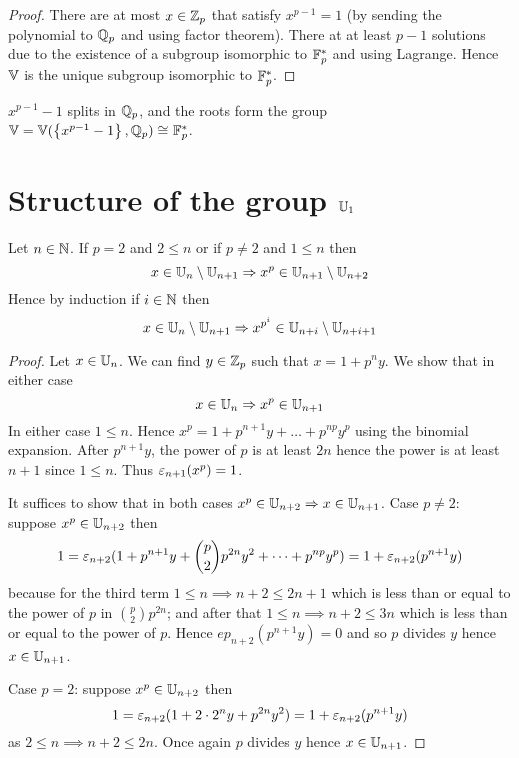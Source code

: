 \begin{proof}
    There are at most $x \in \mathbb{Z}_p$ that satisfy $x^{p-1} = 1$ 
    (by sending the polynomial to $\mathbb{Q}_p$ and using factor theorem).
    There at at least $p - 1$ solutions due to the existence of 
    a subgroup isomorphic to $\mathbb{F}_p^*$ and using Lagrange.
    Hence $\mathbb{V}$ is the unique subgroup isomorphic to $\mathbb{F}_p^*$.
\end{proof}

\begin{cor}
    $x^{p-1} - 1$ splits in $\mathbb{Q}_p$, 
    and the roots form the group 
    $\mathbb{V} = \mathbb{V}(\left\{x^{p-1} - 1\right\},\mathbb{Q}_p) \cong_{} \mathbb{F}_p^*$.
\end{cor}

\section{Structure of the group $\mathbb{U}_1$}

\begin{prop}
    Let $n \in \mathbb{N}$.
    If $p = 2$ and $2 \le n$ 
    or if $p \ne 2$ and $1 \le n$ then
    \[x \in \mathbb{U}_n \setminus \mathbb{U}_{n+1} 
    \Rightarrow x^p \in \mathbb{U}_{n+1} \setminus \mathbb{U}_{n+2} \]
    Hence by induction if $i \in \mathbb{N}$ then
    \[x \in \mathbb{U}_n \setminus \mathbb{U}_{n+1} 
    \Rightarrow x^{p^i} \in \mathbb{U}_{n + i} \setminus \mathbb{U}_{n + i + 1} \]
\end{prop}
\begin{proof}
    Let $x \in \mathbb{U}_n$. 
    We can find $y \in \mathbb{Z}_p$
    such that $x = 1 + p^n y$.
    We show that in either case 
    \[x \in \mathbb{U}_n \Rightarrow x^p \in \mathbb{U}_{n+1}\]
    In either case $1 \le n$.
    Hence $x^p = 1 + p^{n+1} y + \dots + p^{np} y^p$
    using the binomial expansion. 
    After $p^{n+1} y$, the power of $p$ is at least $2n$
    hence the power is at least $n+1$ since $1 \le n$.
    Thus $\varepsilon_{n+1} (x^p) = 1$.

    It suffices to show that in both cases
    $x^p \in \mathbb{U}_{n+2} \Rightarrow x \in \mathbb{U}_{n+1}$.
    Case $p \ne 2$: suppose $x^p \in \mathbb{U}_{n+2}$ then
    \[1 = 
    \varepsilon_{n+2} (
        1 + p^{n+1} y + \binom{p}{2} p^{2n} y^2 
        + \dots + p^{np}y^p
        )
     = 1 + \varepsilon_{n+2}(p^{n+1} y)\]
    because for the third term 
    $1 \le n \implies n + 2 \le 2n + 1$
    which is less than or equal to the power of 
    $p$ in $\binom{p}{2} p^{2n}$;
    and after that $1 \le n \implies n + 2 \le 3n$
    which is less than or equal to the power of $p$.
    Hence $ep_{n+2}(p^{n+1} y) = 0$ and so $p$ divides $y$
    hence $x \in \mathbb{U}_{n+1}$.

    Case $p = 2$: suppose $x^p \in \mathbb{U}_{n+2}$ then
    \[1 = 
        \varepsilon_{n+2} (
            1 + 2 \cdot 2^n y + p^{2n} y^2) 
        = 1 + \varepsilon_{n+2}(p^{n+1} y)\]
    as $2 \le n \implies n+2 \le 2n$.
    Once again $p$ divides $y$ hence $x \in \mathbb{U}_{n+1}$.
\end{proof}

